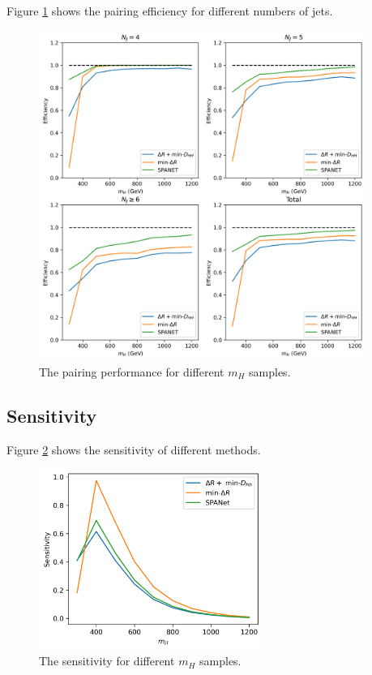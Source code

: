 \documentclass[12pt]{article}
\begin{document}
		Figure \ref{fig:pairing_performance_mass_Njet} shows the pairing efficiency for different numbers of jets.
		\begin{figure}[htpb]
			\centering
			\includegraphics[width=0.95\textwidth]{pairing_efficiency_Njet_resonant-DHH-mindR-SPANet.png}
			\caption{The pairing performance for different $m_H$ samples.}
			\label{fig:pairing_performance_mass_Njet}
		\end{figure}
	\subsection{Sensitivity}%
	\label{sub:sensitivity}
		Figure \ref{fig:sensitivity_mass} shows the sensitivity of different methods.

		\begin{figure}[htpb]
			\centering
			\includegraphics[width=0.65\textwidth]{sensitivity_mass-DHH_mindR-SPANet.png}
			\caption{The sensitivity for different $m_H$ samples.}
			\label{fig:sensitivity_mass}
		\end{figure}
\end{document}
